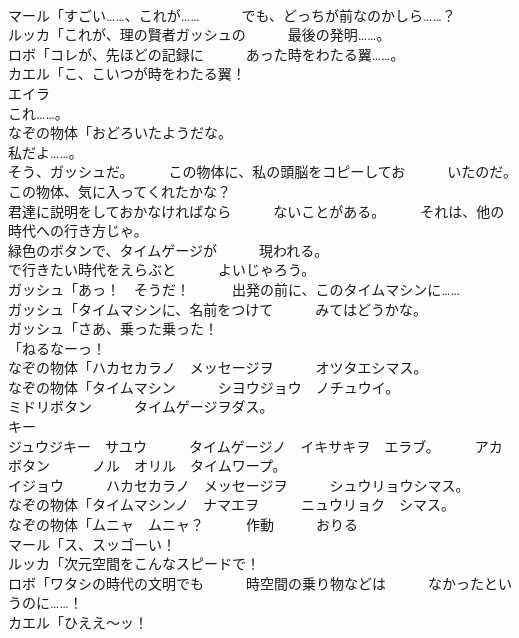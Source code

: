 \documentclass[8pt]{extreport}
\begin{document}
\begin{CJK}{UTF8}{min}
\\	マール「すごい……、これが……　　　でも、どっちが前なのかしら……？	
\\	ルッカ「これが、理の賢者ガッシュの　　　最後の発明……。	
\\	ロボ「コレが、先ほどの記録に　　　あった時をわたる翼……。	
\\	カエル「こ、こいつが時をわたる翼！	
\\	エイラ
\\	これ……。	
\\	なぞの物体「おどろいたようだな。	
\\	私だよ……。	
\\	そう、ガッシュだ。　　　この物体に、私の頭脳をコピーしてお　　　いたのだ。　　　この物体、気に入ってくれたかな？	
\\	君達に説明をしておかなければなら　　　ないことがある。　　　それは、他の時代への行き方じゃ。	
\\	緑色のボタンで、タイムゲージが　　　現われる。　　　
\\	で行きたい時代をえらぶと　　　よいじゃろう。	
\\	ガッシュ「あっ！　そうだ！　　　出発の前に、このタイムマシンに……	
\\	ガッシュ「タイムマシンに、名前をつけて　　　みてはどうかな。	
\\	ガッシュ「さあ、乗った乗った！	
\\	「ねるなーっ！	
\\	なぞの物体「ハカセカラノ　メッセージヲ　　　オツタエシマス。	
\\	なぞの物体「タイムマシン　　　シヨウジョウ　ノチュウイ。	
\\	ミドリボタン　　　タイムゲージヲダス。　　　
\\	キー　
\\	ジュウジキー　サユウ　　　タイムゲージノ　イキサキヲ　エラブ。　　　アカボタン　　　ノル　オリル　タイムワープ。	
\\	イジョウ　　　ハカセカラノ　メッセージヲ　　　シュウリョウシマス。	
\\	なぞの物体「タイムマシンノ　ナマエヲ　　　ニュウリョク　シマス。	
\\	なぞの物体「ムニャ　ムニャ？　　　作動　　　おりる	
\\	マール「ス、スッゴーい！	
\\	ルッカ「次元空間をこんなスピードで！	
\\	ロボ「ワタシの時代の文明でも　　　時空間の乗り物などは　　　なかったというのに……！	
\\	カエル「ひええ～ッ！	

\end{CJK}
\end{document}
